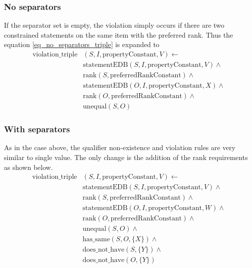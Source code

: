 \documentclass[hyperref,bachelorofscience,fleqn]{cgvpub}
\begin{document}
\subsubsection{No separators}
If the separator set is empty, the violation simply occurs if there are two constrained statements on the same item with the preferred rank. Thus the equation \ref{eq_no_separators_triple} is expanded to
\begin{equation*}
\begin{split}
\text{violation\_triple}&(S, I, \text{propertyConstant}, V) \leftarrow \\
&\text{statementEDB}(S, I, \text{propertyConstant}, V) \wedge{} \\
&\text{rank}(S, \text{preferredRankConstant}) \wedge{} \\
&\text{statementEDB}(O, I, \text{propertyConstant}, X) \wedge{} \\
&\text{rank}(O, \text{preferredRankConstant}) \wedge{} \\
&\text{unequal}(S, O)
\end{split}
\end{equation*}

\subsubsection{With separators}
As in the case above, the qualifier non-existence and violation rules are very similar to single value. The only change is the addition of the rank requirements as shown below.
\begin{equation*}
\begin{split}
\text{violation\_triple}&(S, I, \text{propertyConstant}, V) \leftarrow \\
&\text{statementEDB}(S, I, \text{propertyConstant}, V) \wedge{} \\
&\text{rank}(S, \text{preferredRankConstant}) \wedge{} \\
&\text{statementEDB}(O, I, \text{propertyConstant}, W) \wedge{} \\
&\text{rank}(O, \text{preferredRankConstant}) \wedge{} \\
&\text{unequal}(S, O) \wedge{} \\
&\text{has\_same}(S, O, \{X\}) \wedge{} \\
&\text{does\_not\_have}(S, \{Y\}) \wedge{} \\
&\text{does\_not\_have}(O, \{Y\})
\end{split}
\end{equation*}
\end{document}
